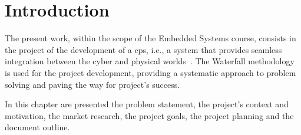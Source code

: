 %
%
%
\chapter{Introduction}%
\label{ch:introduction}
The present work, within the scope of the Embedded Systems course, consists in
the project of the development of a \gls{cps}, i.e., a system that provides
seamless integration between the cyber and physical worlds~\cite{TaoCPS}. The
Waterfall methodology is used for the project development, providing a
systematic approach to problem solving and paving the way for project's success.

In this chapter are presented the problem statement, the project's context and
motivation, the market research, the project goals, the project planning and the document outline.
%
%
%





%
